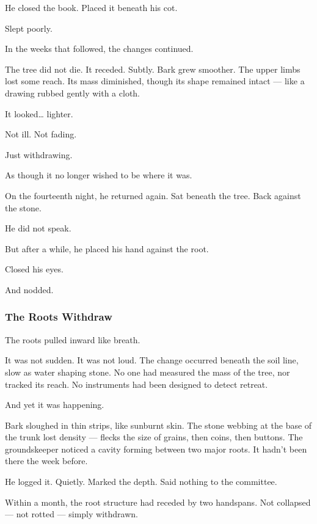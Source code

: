 \documentclass[12pt]{article}
\begin{document}
He closed the book. Placed it beneath his cot.

Slept poorly.

\vspace{1em}

In the weeks that followed, the changes continued.

The tree did not die. It receded. Subtly. Bark grew smoother. The upper limbs lost some reach. Its mass diminished, though its shape remained intact --- like a drawing rubbed gently with a cloth.

It looked… lighter.

Not ill. Not fading.

Just withdrawing.

As though it no longer wished to be where it was.

\vspace{1em}

On the fourteenth night, he returned again. Sat beneath the tree. Back against the stone.

He did not speak.

But after a while, he placed his hand against the root.

Closed his eyes.

And nodded.

\dotfill

\subsubsection{The Roots Withdraw}

The roots pulled inward like breath.

It was not sudden. It was not loud. The change occurred beneath the soil line, slow as water shaping stone. No one had measured the mass of the tree, nor tracked its reach. No instruments had been designed to detect retreat.

And yet it was happening.

Bark sloughed in thin strips, like sunburnt skin. The stone webbing at the base of the trunk lost density --- flecks the size of grains, then coins, then buttons. The groundskeeper noticed a cavity forming between two major roots. It hadn’t been there the week before.

He logged it. Quietly. Marked the depth. Said nothing to the committee.

Within a month, the root structure had receded by two handspans. Not collapsed --- not rotted --- simply withdrawn.
\end{document}
